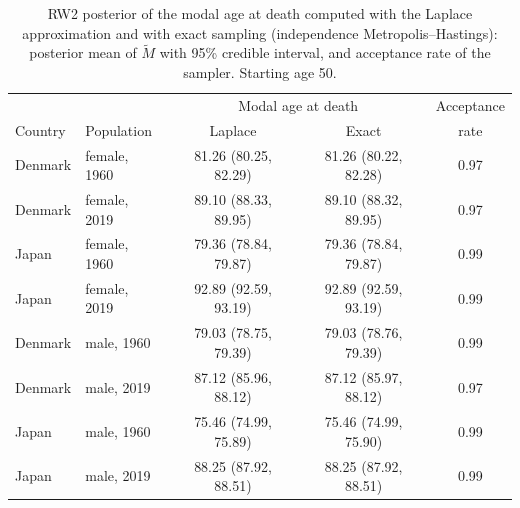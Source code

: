 \begin{table}[htb!]
\centering
\caption{RW2 posterior of the modal age at death computed with the Laplace approximation and with exact sampling (independence Metropolis--Hastings): posterior mean of $\tilde{M}$ with 95\% credible interval, and acceptance rate of the sampler. Starting age 50.}
\label{tab:app_mcmc}
\small
\begin{tabular}{llccc}
\hline
 & & \multicolumn{2}{c}{Modal age at death} & Acceptance \\
Country & Population & Laplace & Exact & rate \\
\hline
Denmark & female, 1960 & 81.26 (80.25, 82.29) & 81.26 (80.22, 82.28) & 0.97 \\
Denmark & female, 2019 & 89.10 (88.33, 89.95) & 89.10 (88.32, 89.95) & 0.97 \\
Japan & female, 1960 & 79.36 (78.84, 79.87) & 79.36 (78.84, 79.87) & 0.99 \\
Japan & female, 2019 & 92.89 (92.59, 93.19) & 92.89 (92.59, 93.19) & 0.99 \\
Denmark & male, 1960 & 79.03 (78.75, 79.39) & 79.03 (78.76, 79.39) & 0.99 \\
Denmark & male, 2019 & 87.12 (85.96, 88.12) & 87.12 (85.97, 88.12) & 0.97 \\
Japan & male, 1960 & 75.46 (74.99, 75.89) & 75.46 (74.99, 75.90) & 0.99 \\
Japan & male, 2019 & 88.25 (87.92, 88.51) & 88.25 (87.92, 88.51) & 0.99 \\
\hline
\end{tabular}
\end{table}
